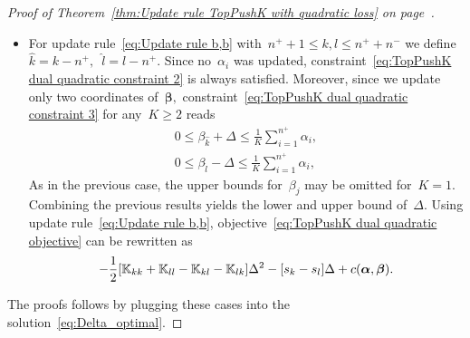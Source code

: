 \begin{proof}[Proof of Theorem~\ref{thm:Update rule TopPushK with quadratic loss} on page~\pageref{thm:Update rule TopPushK with quadratic loss}]
\begin{itemize}
    \item For update rule~\eqref{eq:Update rule b,b} with~$n^+ + 1\le k,l \le n^+ + n^-$ we define~$\hat{k} = k - n^+,$~$\hat{l} = l - n^+.$ Since no~$\alpha_i$ was updated, constraint~\eqref{eq:TopPushK dual quadratic constraint 2} is always satisfied. Moreover, since we update only two coordinates of~$\bm{\beta},$ constraint~\eqref{eq:TopPushK dual quadratic constraint 3} for any~$K \geq 2$ reads
    \begin{equation}\label{eq: TopPushK dual quadratic b,b - bounds}
      \begin{aligned}
        0 \leq \beta_{\hat{k}} + \Delta \leq \frac{1}{K} \sum_{i = 1}^{n^+} \alpha_i, \\
        0 \leq \beta_{\hat{l}} - \Delta \leq \frac{1}{K} \sum_{i = 1}^{n^+} \alpha_i,
      \end{aligned}
    \end{equation}
    As in the previous case, the upper bounds for~$\beta_j$ may be omitted for~$K = 1$. Combining the previous results yields the lower and upper bound of~$\Delta.$ Using update rule~\eqref{eq:Update rule b,b}, objective~\eqref{eq:TopPushK dual quadratic objective} can be rewritten as
    \begin{equation*}
      - \frac{1}{2} \Brac[s]{\K_{kk} + \K_{ll} - \K_{kl} - \K_{lk}} \Delta^2 - \Brac[s]{s_k - s_l} \Delta + c(\bm{\alpha}, \bm{\beta}).
    \end{equation*}
  \end{itemize}
  The proofs follows by plugging these cases into the solution~\eqref{eq:Delta_optimal}.
\end{proof}


\subsection{\PatMat}

